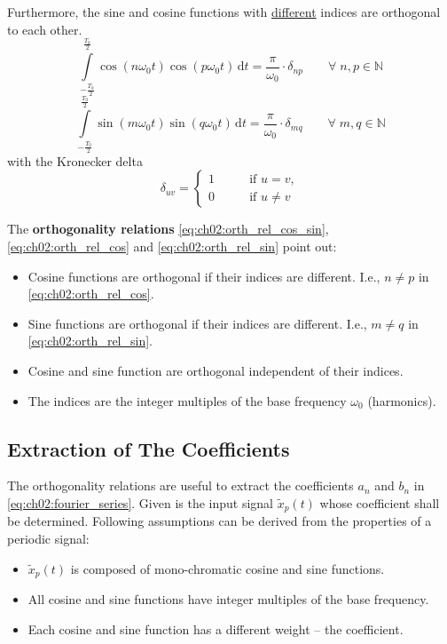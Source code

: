 \begin{refsection}
Furthermore, the sine and cosine functions with \underline{different} indices are orthogonal to each other.
\begin{equation}
	\int\limits_{-\frac{T_0}{2}}^{\frac{T_0}{2}} \cos\left(n \omega_0 t\right) \cos\left(p \omega_0 t\right) \, \mathrm{d} t = \frac{\pi}{\omega_0} \cdot \delta_{np} \qquad \forall \; n, p \in \mathbb{N}
	\label{eq:ch02:orth_rel_cos}
\end{equation}
\begin{equation}
	\int\limits_{-\frac{T_0}{2}}^{\frac{T_0}{2}} \sin\left(m \omega_0 t\right) \sin\left(q \omega_0 t\right) \, \mathrm{d} t = \frac{\pi}{\omega_0} \cdot \delta_{mq} \qquad \forall \; m, q \in \mathbb{N}
	\label{eq:ch02:orth_rel_sin}
\end{equation}
with the Kronecker delta
\begin{equation}
	\delta_{uv} = \begin{cases}
		1 & \qquad \text{if } u = v, \\
		0 & \qquad \text{if } u \neq v
	\end{cases}
	\label{eq:ch02:kronecker_delta}
\end{equation}

The  \textbf{orthogonality relations} \eqref{eq:ch02:orth_rel_cos_sin}, \eqref{eq:ch02:orth_rel_cos} and \eqref{eq:ch02:orth_rel_sin} point out:
\begin{itemize}
	\item Cosine functions are orthogonal if their indices are different. I.e., $n \neq p$ in \eqref{eq:ch02:orth_rel_cos}.
	\item Sine functions are orthogonal if their indices are different. I.e., $m \neq q$ in \eqref{eq:ch02:orth_rel_sin}.
	\item Cosine and sine function are orthogonal independent of their indices.
	\item The indices are the integer multiples of the base frequency $\omega_0$ (harmonics).
\end{itemize}

\subsection{Extraction of The Coefficients}

The orthogonality relations are useful to extract the coefficients $a_n$ and $b_n$ in \eqref{eq:ch02:fourier_series}. Given is the input signal $\tilde{x}_p(t)$ whose coefficient shall be determined. Following assumptions can be derived from the properties of a periodic signal:
\begin{itemize}
	\item $\tilde{x}_p(t)$ is composed of mono-chromatic cosine and sine functions.
	\item All cosine and sine functions have integer multiples of the base frequency.
	\item Each cosine and sine function has a different weight -- the coefficient.
\end{itemize}


\end{refsection}
